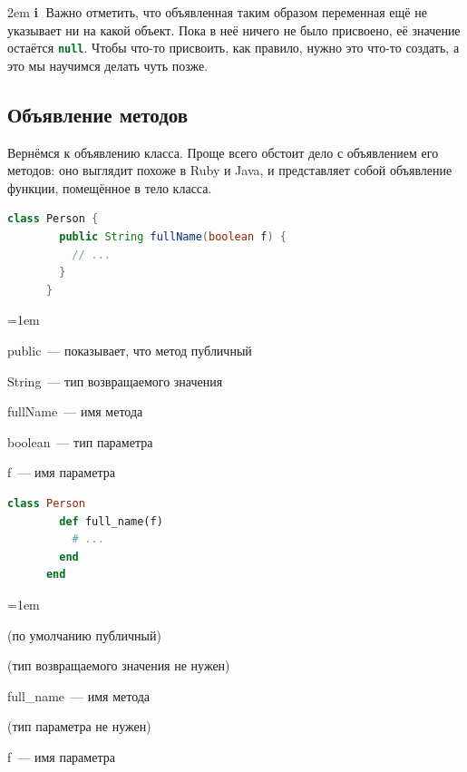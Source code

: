 \documentclass[a4paper, 14pt, titlepage]{extarticle}
\newenvironment{indented}%
    { \begingroup %
        \noindent %
        \leftskip2em %
        \rightskip\leftskip }%
    { \par\endgroup }
\newenvironment{extrainfo}%
    { \begin{indented} %
        \color{dkblue} %
        \small %
        \textbf{\textcircled{\footnotesize i}} }%
    { \end{indented} }
\newenvironment{halfpage}%
    {\noindent\begin{minipage}[h]{0.49\linewidth}} %
    {\end{minipage}\hfill}
\newcommand{\inlinecode}[2][Java]{\lstinline[basicstyle=\ttfamily, language=#1]{#2}}
\newenvironment{compactitemize} %
    {\begin{list}{\labelitemi}{\leftmargin=1em}}%
    {\end{list}}
\begin{document}
  \begin{extrainfo}
    Важно отметить, что объявленная таким образом переменная ещё не указывает ни на какой объект. Пока
    в неё ничего не было присвоено, её значение остаётся \inlinecode[Java]{null}. Чтобы что-то
    присвоить, как правило, нужно это что-то создать, а это мы научимся делать чуть позже.
  \end{extrainfo}

  \subsection{Объявление методов}

  Вернёмся к объявлению класса. Проще всего обстоит дело с объявлением его методов: оно выглядит
  похоже в Ruby и Java, и представляет собой объявление функции, помещённое в тело класса.

  \begin{halfpage}
    \begin{lstlisting}[language=Java, title={Метод в Java}, gobble=6, texcl]
      class Person {
        public String fullName(boolean f) {
          // ...
        }
      }
    \end{lstlisting}
    \footnotesize
    \begin{compactitemize}
      \item public~--- показывает, что метод публичный
      \item String~--- тип возвращаемого значения
      \item fullName~--- имя метода
      \item boolean~--- тип параметра
      \item f~--- имя параметра
    \end{compactitemize}
  \end{halfpage}
  \begin{halfpage}
    \begin{lstlisting}[language=Ruby, title={Метод в Ruby}, gobble=6, texcl]
      class Person
        def full_name(f)
          # ...
        end
      end
    \end{lstlisting}
    \footnotesize
    \begin{compactitemize}
      \item (по умолчанию публичный)
      \item (тип возвращаемого значения не нужен)
      \item full\_name~--- имя метода
      \item (тип параметра не нужен)
      \item f~--- имя параметра
    \end{compactitemize}
  \end{halfpage}
  \vskip 5mm %
\end{document}
